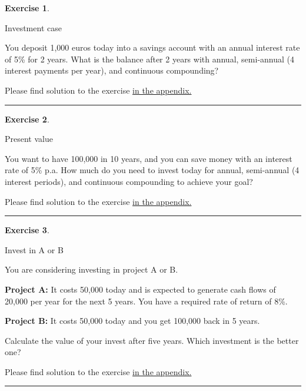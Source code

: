 \documentclass[
  12pt,
  oneside]{book}
\theoremstyle{definition}
\theoremstyle{definition}
\theoremstyle{definition}
\newtheorem{exercise}{Exercise}[chapter]
\theoremstyle{definition}
\theoremstyle{remark}
\begin{document}
\begin{exercise}
\protect\hypertarget{exr:invcase}{}\label{exr:invcase}

Investment case

You deposit 1,000 euros today into a savings account with an annual interest rate of 5\% for 2 years. What is the balance after 2 years with annual, semi-annual (4 interest payments per year), and continuous compounding?

Please find solution to the exercise \protect\hyperlink{sol:invcase}{in the appendix.}

\begin{center}\rule{0.5\linewidth}{0.5pt}\end{center}

\end{exercise}

\begin{exercise}
\protect\hypertarget{exr:presentvalueC}{}\label{exr:presentvalueC}

Present value

You want to have 100,000 in 10 years, and you can save money with an interest rate of 5\% p.a. How much do you need to invest today for annual, semi-annual (4 interest periods), and continuous compounding to achieve your goal?

Please find solution to the exercise \protect\hyperlink{sol:presentvalueC}{in the appendix.}

\begin{center}\rule{0.5\linewidth}{0.5pt}\end{center}

\end{exercise}

\begin{exercise}
\protect\hypertarget{exr:invaorb}{}\label{exr:invaorb}

Invest in A or B

You are considering investing in project A or B.

\textbf{Project A:} It costs 50,000 today and is expected to generate cash flows of 20,000 per year for the next 5 years. You have a required rate of return of 8\%.

\textbf{Project B:} It costs 50,000 today and you get 100,000 back in 5 years.

Calculate the value of your invest after five years. Which investment is the better one?

Please find solution to the exercise \protect\hyperlink{sol:invaorb}{in the appendix.}

\begin{center}\rule{0.5\linewidth}{0.5pt}\end{center}

\end{exercise}
\end{document}

